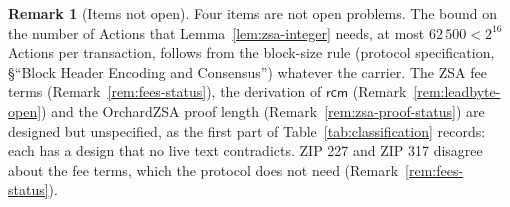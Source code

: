 \documentclass[11pt,a4paper]{article}
\theoremstyle{definition}
\newtheorem{remark}[theorem]{Remark}
\newcommand{\rcm}{\ensuremath{\mathsf{rcm}}}
\begin{document}
\begin{remark}[Items not open]
Four items are not open problems. The bound on the number of Actions that
Lemma~\ref{lem:zsa-integer} needs, at most $62\,500 < 2^{16}$ Actions per
transaction, follows from the block-size rule (protocol specification,
\S``Block Header Encoding and Consensus'') whatever the carrier. The ZSA
fee terms (Remark~\ref{rem:fees-status}), the derivation of $\rcm$
(Remark~\ref{rem:leadbyte-open}) and the OrchardZSA proof length
(Remark~\ref{rem:zsa-proof-status}) are designed but unspecified, as the
first part of Table~\ref{tab:classification} records: each has a design
that no live text contradicts. ZIP 227 and ZIP 317 disagree about the fee
terms, which the protocol does not need (Remark~\ref{rem:fees-status}).
\end{remark}
\end{document}
